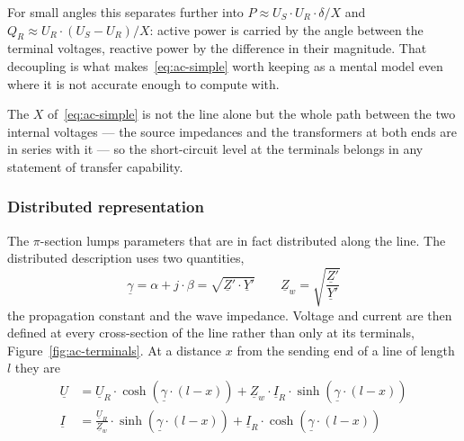 For small angles this separates further into
$P \approx U_S \cdot U_R \cdot \delta / X$ and
$Q_R \approx U_R \cdot \left(U_S - U_R\right) / X$: active power is carried
by the angle between the terminal voltages, reactive power by the difference
in their magnitude. That decoupling is what makes~\eqref{eq:ac-simple} worth
keeping as a mental model even where it is not accurate enough to compute
with.

The $X$ of~\eqref{eq:ac-simple} is not the line alone but the whole path
between the two internal voltages --- the source impedances and the
transformers at both ends are in series with it --- so the short-circuit
level at the terminals belongs in any statement of transfer capability.

\subsubsection{Distributed representation}
\label{sec:ac-wave}

The $\pi$-section lumps parameters that are in fact distributed along the
line. The distributed description uses two quantities,
\begin{equation}
  \underline{\gamma} = \alpha + j \cdot \beta
    = \sqrt{\underline{Z}' \cdot \underline{Y}'}
  \qquad
  \underline{Z}_w = \sqrt{\frac{\underline{Z}'}{\underline{Y}'}}
  \label{eq:ac-gamma-zw}
\end{equation}
the propagation constant and the wave impedance. Voltage and current are
then defined at every cross-section of the line rather than only at its
terminals, Figure~\ref{fig:ac-terminals}. At a distance $x$ from the
sending end of a line of length $l$ they are
\begin{align}
  \underline{U} &= \underline{U}_R \cdot
      \cosh\left(\underline{\gamma} \cdot \left(l-x\right)\right)
    + \underline{Z}_w \cdot \underline{I}_R \cdot
      \sinh\left(\underline{\gamma} \cdot \left(l-x\right)\right)
  \label{eq:ac-u-x} \\[0.3em]
  \underline{I} &= \frac{\underline{U}_R}{\underline{Z}_w} \cdot
      \sinh\left(\underline{\gamma} \cdot \left(l-x\right)\right)
    + \underline{I}_R \cdot
      \cosh\left(\underline{\gamma} \cdot \left(l-x\right)\right)
  \label{eq:ac-i-x}
\end{align}

